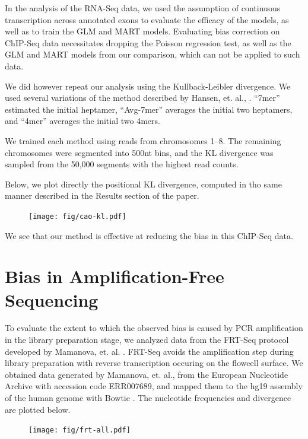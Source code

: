 \documentclass[letterpaper]{article}
\begin{document}
In the analysis of the RNA-Seq data, we used the assumption of continuous
transcription across annotated exons to evaluate the efficacy of the models, as
well as to train the GLM and MART models. Evaluating bias correction on ChIP-Seq
data necessitates dropping the Poisson regression test, as well as the GLM and
MART models from our comparison, which can not be applied to such data.

We did however repeat our analysis using the Kullback-Leibler divergence.
We used several variations of the method described by Hansen, et. al.,
\cite{Hansen2010}. ``7mer'' estimated the initial heptamer, ``Avg-7mer''
averages the initial two heptamers, and ``4mer'' averages the initial two 4mers.

We trained each method using reads from chromosomes 1--8. The
remaining chromosomes were segmented into 500nt bins, and the KL divergence was
sampled from the 50,000 segments with the highest read counts.

Below, we plot directly the positional KL divergence, computed in tho same
manner described in the Results section of the paper.

\begin{figure}[H]
\begin{center}
\texttt{[image: fig/cao-kl.pdf]}
\end{center}
\label{fig:trimmedfreqs}
\end{figure}

We see that our method is effective at reducing the bias in this ChIP-Seq data.



\section{Bias in Amplification-Free Sequencing}

To evaluate the extent to which the observed bias is caused by PCR amplification
in the library preparation stage, we analyzed data from the FRT-Seq protocol
developed by Mamanova, et. al. \cite{Mamanova2010}. FRT-Seq avoids the
amplification step during library preparation with reverse transcription
occuring on the flowcell surface. We obtained data generated by Mamanova, et.
al., from the European Nucleotide Archive with accession code ERR007689, and
mapped them to the hg19 assembly of the human genome with Bowtie
\cite{Langmead2009}. The nucleotide frequencies and divergence are plotted
below.

\begin{figure}[H]
\begin{center}
\texttt{[image: fig/frt-all.pdf]}
\end{center}
\label{fig:trimmedfreqs}
\end{figure}
\end{document}
